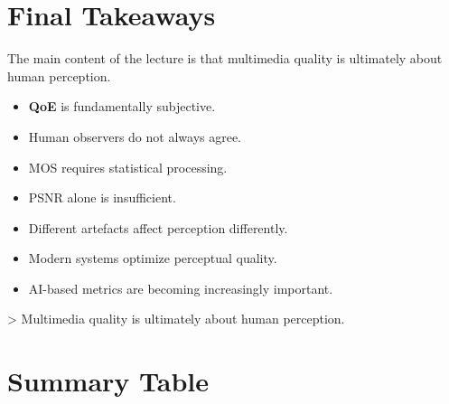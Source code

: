 \section{Final Takeaways}

The main content of the lecture is that multimedia quality is ultimately about human perception.

\begin{itemize}
\item \textbf{QoE} is fundamentally subjective.
\item Human observers do not always agree.
\item MOS requires statistical processing.
\item PSNR alone is insufficient.
\item Different artefacts affect perception differently.
\item Modern systems optimize perceptual quality.
\item AI-based metrics are becoming increasingly important.
\end{itemize}

\textgreater{} Multimedia quality is ultimately about human perception.

\section{Summary Table}

